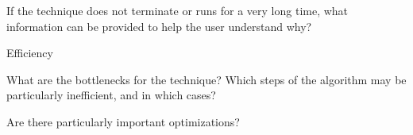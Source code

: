 \documentclass[a4paper]{article}
\begin{document}
\begin{landscape}
\begin{minipage}[t]{0.2\linewidth}
\begin{betterlist}
\begin{betterlist}
			\item If the technique does not terminate or runs for a very long time, what information can be provided to help the user understand why?

		\end{betterlist}
		\item \alert{Efficiency}
		\begin{betterlist}
			\item What are the bottlenecks for the technique? Which steps of the algorithm may be particularly inefficient, and in which cases?

			\item Are there particularly important optimizations?


\end{betterlist}
\end{betterlist}
\end{minipage}
\end{landscape}
\end{document}
